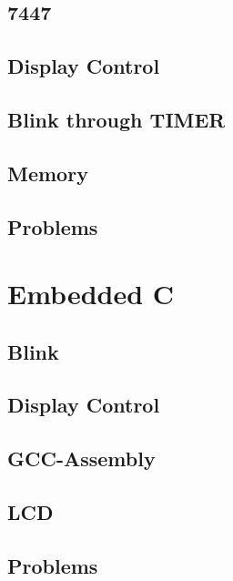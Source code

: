 \documentclass[journal]{IEEEtran}
\begin{document}
\subsection{7447}

\subsection{Display Control}

\subsection{Blink through TIMER}

\subsection{Memory}

\subsection{Problems}

\newpage
\section{Embedded C}
\subsection{Blink}

\subsection{Display Control}

\subsection{GCC-Assembly}

\subsection{LCD}

\subsection{Problems}

\end{document}

